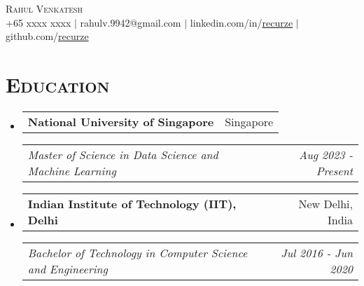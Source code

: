 \documentclass{article}
\makeatletter
\newcommand{\headerrow}[2]
{\begin{tabular*}{\linewidth}{l@{\extracolsep{\fill}}r}
    #1 &
    #2 \\
\end{tabular*}}
\makeatother
\begin{document}
\thispagestyle{empty}

\begin{center}
    {\huge \textsc{Rahul Venkatesh}} \\[2pt]
    +65 xxxx xxxx
    $\mid$
    rahulv.9942@gmail.com
    $\mid$
    linkedin.com/in/\href{https://www.linkedin.com/in/recurze}{recurze}
    $\mid$
    github.com/\href{https://github.com/recurze}{recurze}
\end{center}

\section*{\textsc{\textbf{Education}}}
\begin{itemize}[leftmargin=0em]

\item[]
    \headerrow {\textbf{National University of Singapore}}{Singapore}
    \headerrow {\emph{Master of Science in Data Science and Machine Learning}}{\emph{Aug 2023 - Present}}

\item[]
    \headerrow {\textbf{Indian Institute of Technology (IIT), Delhi}}{New Delhi, India}
    \headerrow {\emph{Bachelor of Technology in Computer Science and Engineering}}{\emph{Jul 2016 - Jun 2020}}

\end{itemize}

%
\end{document}
